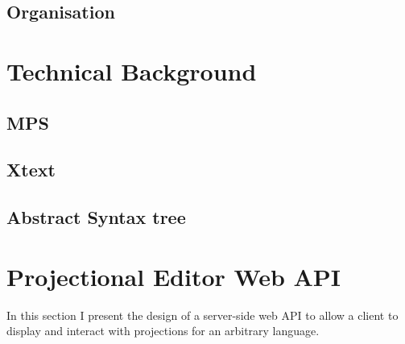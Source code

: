 \documentclass{report}
\begin{document}
\subsection{Organisation} 
\section{Technical Background}
\subsection{MPS}
\subsection{Xtext}
\subsection{Abstract Syntax tree}


\section{Projectional Editor Web API}
In this section I present the design of a server-side web API to allow a client to display and interact with projections for an arbitrary language. 
\end{document}
